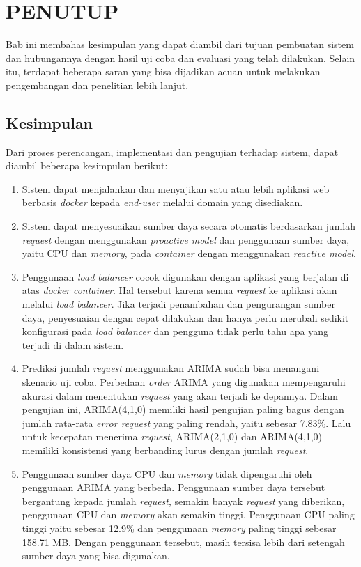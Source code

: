 \chapter{PENUTUP}
    Bab ini membahas kesimpulan yang dapat diambil dari tujuan pembuatan sistem dan hubungannya dengan hasil uji coba dan evaluasi yang telah dilakukan. Selain itu, terdapat beberapa saran yang bisa dijadikan acuan untuk melakukan pengembangan dan penelitian lebih lanjut.
        
	\section{Kesimpulan}
        Dari proses perencangan, implementasi dan pengujian terhadap sistem, dapat diambil beberapa kesimpulan berikut:
		\begin{enumerate}
            \item Sistem dapat menjalankan dan menyajikan satu atau lebih aplikasi web berbasis \textit{docker} kepada \textit{end-user} melalui domain yang disediakan.
            \item Sistem dapat menyesuaikan sumber daya secara otomatis berdasarkan jumlah \textit{request} dengan menggunakan \textit{proactive model} dan penggunaan sumber daya, yaitu CPU dan \textit{memory}, pada \textit{container} dengan menggunakan \textit{reactive model}.
            \item Penggunaan \textit{load balancer} cocok digunakan dengan aplikasi yang berjalan di atas \textit{docker} \textit{container}. Hal tersebut karena semua \textit{request} ke aplikasi akan melalui \textit{load balancer}. Jika terjadi penambahan dan pengurangan sumber daya, penyesuaian dengan cepat dilakukan dan hanya perlu merubah sedikit konfigurasi pada \textit{load balancer} dan pengguna tidak perlu tahu apa yang terjadi di dalam sistem.
            \item Prediksi jumlah \textit{request} menggunakan ARIMA sudah bisa menangani skenario uji coba. Perbedaan \textit{order} ARIMA yang digunakan mempengaruhi akurasi dalam menentukan \textit{request} yang akan terjadi ke depannya. Dalam pengujian ini, ARIMA(4,1,0) memiliki hasil pengujian paling bagus dengan jumlah rata-rata \textit{error request} yang paling rendah, yaitu sebesar 7.83\%. Lalu untuk kecepatan menerima \textit{request}, ARIMA(2,1,0) dan ARIMA(4,1,0) memiliki konsistensi yang berbanding lurus dengan jumlah \textit{request}.
            \item Penggunaan sumber daya CPU dan \textit{memory} tidak dipengaruhi oleh penggunaan ARIMA yang berbeda. Penggunaan sumber daya tersebut bergantung kepada jumlah \textit{request}, semakin banyak \textit{request} yang diberikan, penggunaan CPU dan \textit{memory} akan semakin tinggi. Penggunaan CPU paling tinggi yaitu sebesar 12.9\% dan penggunaan \textit{memory} paling tinggi sebesar 158.71 MB. Dengan penggunaan tersebut, masih tersisa lebih dari setengah sumber daya yang bisa digunakan.

\end{enumerate}
